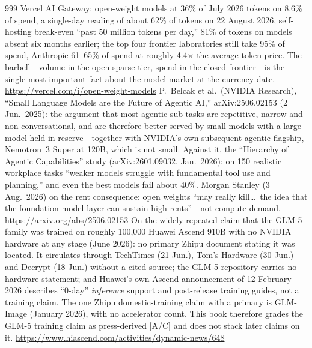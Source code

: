 \begin{thebibliography}{999}
 Vercel AI Gateway: open-weight models at 36\% of July 2026 tokens on 8.6\% of spend, a single-day reading of about 62\% of tokens on 22 August 2026, self-hosting break-even ``past 50 million tokens per day,'' 81\% of tokens on models absent six months earlier; the top four frontier laboratories still take 95\% of spend, Anthropic 61--65\% of spend at roughly 4.4$\times$ the average token price. The barbell---volume in the open sparse tier, spend in the closed frontier---is the single most important fact about the model market at the currency date. \url{https://vercel.com/i/open-weight-models}
 P.~Belcak et al.\ (NVIDIA Research), ``Small Language Models are the Future of Agentic AI,'' arXiv:2506.02153 (2 Jun.\ 2025): the argument that most agentic sub-tasks are repetitive, narrow and non-conversational, and are therefore better served by small models with a large model held in reserve---together with NVIDIA's own subsequent agentic flagship, Nemotron~3 Super at 120B, which is not small. Against it, the ``Hierarchy of Agentic Capabilities'' study (arXiv:2601.09032, Jan.\ 2026): on 150 realistic workplace tasks ``weaker models struggle with fundamental tool use and planning,'' and even the best models fail about 40\%. Morgan Stanley (3 Aug.\ 2026) on the rent consequence: open weights ``may really kill\ldots\ the idea that the foundation model layer can sustain high rents''---not compute demand. \url{https://arxiv.org/abs/2506.02153}
 On the widely repeated claim that the GLM-5 family was trained on roughly 100{,}000 Huawei Ascend 910B with no NVIDIA hardware at any stage (June 2026): no primary Zhipu document stating it was located. It circulates through TechTimes (21 Jun.), Tom's Hardware (30 Jun.) and Decrypt (18 Jun.) without a cited source; the GLM-5 repository carries no hardware statement; and Huawei's own Ascend announcement of 12 February 2026 describes ``0-day'' \emph{inference} support and post-release training guides, not a training claim. The one Zhipu domestic-training claim with a primary is GLM-Image (January 2026), with no accelerator count. This book therefore grades the GLM-5 training claim as press-derived [A/C] and does not stack later claims on it. \url{https://www.hiascend.com/activities/dynamic-news/648}

\end{thebibliography}
